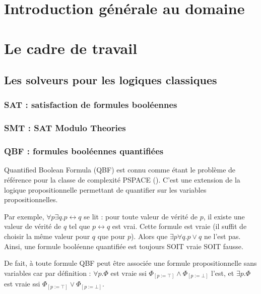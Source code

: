
\section{Introduction générale au domaine}


\section{Le cadre de travail}

\subsection{Les solveurs pour les logiques classiques}

\subsubsection{SAT : satisfaction de formules booléennes}

\subsubsection{SMT : SAT Modulo Theories}


\subsubsection{QBF : formules booléennes quantifiées}
Quantified Boolean Formula (QBF) est connu comme étant le problème de référence pour la classe de complexité PSPACE (\cite{Stockmeyer:1973:WPR:800125.804029}). C'est une extension de la logique propositionnelle permettant de quantifier sur les variables propositionnelles. 

Par exemple, $\forall p \exists q.p \leftrightarrow q$ se lit : pour toute valeur de vérité de $p$, il existe une valeur de vérité de $q$ tel que $p \leftrightarrow q$ est vrai. Cette formule est vraie (il suffit de choisir la même valeur pour $q$ que pour $p$). Alors que  $\exists p \forall q.p \lor q$ ne l'est pas. Ainsi, une formule booléenne quantifiée est toujours SOIT vraie SOIT fausse. 

De fait, à toute formule QBF peut être associée une formule propositionnelle sans variables car par définition : 
$\forall p.\Phi$ est vraie ssi $\Phi_{[p:=\top]} \wedge \Phi_{[p:=\bot]}$ l'est, et $\exists p.\Phi$ est vraie ssi $\Phi_{[p:=\top]} \vee \Phi_{[p:=\bot]}$. 

